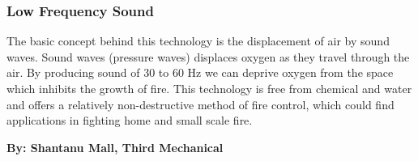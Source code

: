 \documentclass[11pt]{article} %
\begin{document}
\begin{multicols}{2}
\subsubsection*{Low Frequency Sound}
The basic concept behind this technology is the displacement of air by sound 
waves. Sound waves (pressure waves) displaces oxygen as they travel through the 
air. By producing sound of 30 to 60 Hz we can deprive oxygen from the space 
which inhibits the growth of fire. This technology is free from chemical and water 
and offers a relatively non-destructive method of fire control, which could find 
applications in fighting home and small scale fire.

\end{multicols}


\deco{10pt}{$\clubsuit$~$\clubsuit$~$\clubsuit$}

  \hypertarget{desalination}{}  %
  { \small  \textbf{By: Shantanu Mall, Third Mechanical}\\ }
\end{document}
